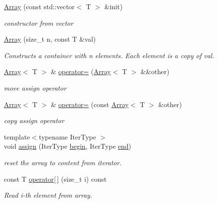 \begin{DoxyCompactItemize}
\hyperlink{classtvm_1_1Array_a92ba9f4611201b6bad1fb46f5944922e}{Array} (const std\+::vector$<$ T $>$ \&init)
\begin{DoxyCompactList}\small\item\em constructor from vector \end{DoxyCompactList}\item 
\hyperlink{classtvm_1_1Array_ae409fb0a54ed7fb8c34b7b0445f88802}{Array} (size\+\_\+t n, const T \&val)
\begin{DoxyCompactList}\small\item\em Constructs a container with n elements. Each element is a copy of val. \end{DoxyCompactList}\item 
\hyperlink{classtvm_1_1Array}{Array}$<$ T $>$ \& \hyperlink{classtvm_1_1Array_acf66932043c572cb9fec8813dbe5d596}{operator=} (\hyperlink{classtvm_1_1Array}{Array}$<$ T $>$ \&\&other)
\begin{DoxyCompactList}\small\item\em move assign operator \end{DoxyCompactList}\item 
\hyperlink{classtvm_1_1Array}{Array}$<$ T $>$ \& \hyperlink{classtvm_1_1Array_a06969623060ee1bb0e82ba7a43513450}{operator=} (const \hyperlink{classtvm_1_1Array}{Array}$<$ T $>$ \&other)
\begin{DoxyCompactList}\small\item\em copy assign operator \end{DoxyCompactList}\item 
{\footnotesize template$<$typename Iter\+Type $>$ }\\void \hyperlink{classtvm_1_1Array_a5eebc9ddbd2e257d0586443b6d493df3}{assign} (Iter\+Type \hyperlink{classtvm_1_1Array_a5db0d3faad39ca865162e50d555a25fa}{begin}, Iter\+Type \hyperlink{classtvm_1_1Array_a6f05e6a14eca3ea865da0f293b4a5325}{end})
\begin{DoxyCompactList}\small\item\em reset the array to content from iterator. \end{DoxyCompactList}\item 
const T \hyperlink{classtvm_1_1Array_afed60e692eab1b2511b07a2b20751878}{operator\mbox{[}$\,$\mbox{]}} (size\+\_\+t i) const 
\begin{DoxyCompactList}\small\item\em Read i-\/th element from array. \end{DoxyCompactList}\item 

\end{DoxyCompactItemize}
